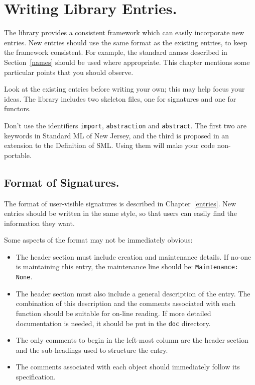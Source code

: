 %
%
%

\chapter{Writing Library Entries.}		\label{implement}

The library provides a consistent framework which can easily incorporate
new entries.  New entries should use the same format as the existing
entries, to keep the framework consistent.  For example, the standard
names described in Section~\ref{names} should be used where appropriate.
This chapter mentions some particular points that you should observe.

Look at the existing entries before writing your own; this may
help focus your ideas.  The library includes two skeleton files, one for
signatures and one for functors.

Don't use the identifiers {\tt import}, {\tt abstraction} and {\tt abstract}.
The first two are keywords in Standard ML of New Jersey, and the third
is proposed in an extension to the Definition of SML.  Using them will
make your code non-portable.
 

\section{Format of Signatures.}

The format of user-visible signatures is described in Chapter~\ref{entries}.  
New entries should be written in the same style, so that users can
easily find the information they want.

Some aspects of the format may not be immediately obvious:
\begin{itemize}
  \item The header section must include creation and maintenance details.
	If no-one is maintaining this entry, the maintenance line should
	be: {\tt Maintenance: None}.
  \item The header section must also include a general description of
	the entry.  The combination of this description and the comments
	associated with each function should be suitable for on-line reading.
	If more detailed documentation is needed, it should be put
	in the {\tt doc} directory.
  \item The only comments to begin in the left-most column are the header
	section and the sub-headings used to structure the entry.
  \item The comments associated with each object should immediately follow
	its specification.
\end{itemize}



